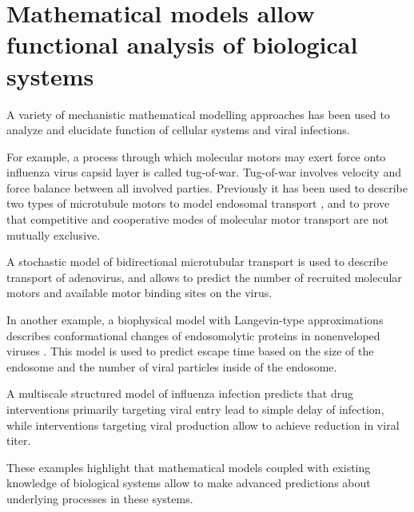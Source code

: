 \section{Mathematical models allow functional analysis of biological systems}

A variety of mechanistic mathematical modelling approaches has been used to analyze and elucidate function of cellular systems and viral infections.

For example, a process through which molecular motors may exert force onto influenza virus capsid layer is called tug-of-war. Tug-of-war involves velocity and force balance between all involved parties. Previously it has been used to describe two types of microtubule motors to model endosomal transport \cite{muller2008tug}, and to prove that competitive and cooperative modes of molecular motor transport are not mutually exclusive.

A stochastic model of bidirectional microtubular transport \cite{gazzola2009stochastic} is used to describe transport of adenovirus, and allows to predict the number of recruited molecular motors and available motor binding sites on the virus.

In another example, a biophysical model with  Langevin-type approximations  describes conformational changes of endosomolytic proteins in nonenveloped viruses \cite{lagache2012modeling}. This model is used to predict escape time based on the size of the endosome and the number of viral particles inside of the endosome.

A multiscale structured model of influenza infection \cite{heldt2013multiscale} predicts that drug interventions primarily targeting viral entry lead to simple delay of infection, while interventions targeting viral production allow to achieve reduction in viral titer.

These examples highlight that mathematical models coupled with existing knowledge of biological systems allow to make advanced predictions about underlying processes in these systems.